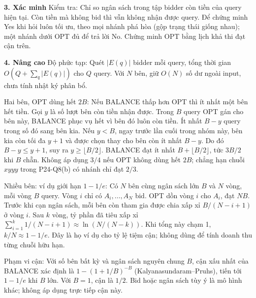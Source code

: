 \documentclass[10pt,a4paper,twocolumn]{article}
\newcommand{\key}[1]{#1:\enspace}
\newcommand{\unitheading}[2]{%
  \par\addvspace{1pt}\noindent\textbf{#1. #2}\enspace}
\newcommand{\unitverification}{\unitheading{3}{Xác minh}}
\newcommand{\unitadvanced}{\unitheading{4}{Nâng cao}}
\begin{document}

\unitverification
\key{Kiểm tra} Chỉ so ngân sách trong tập bidder còn tiền của query hiện tại. Còn tiền mà không bid thì vẫn không nhận được query. Để chứng minh Yes khi hỏi luôn tối ưu, theo mọi nhánh phá hòa (gộp trạng thái giống nhau); một nhánh dưới OPT đủ để trả lời No. Chứng minh OPT bằng lịch khả thi đạt cận trên.

\unitadvanced
\key{Độ phức tạp} Quét $|E(q)|$ bidder mỗi query, tổng thời gian $O(Q+\sum_q|E(q)|)$ cho $Q$ query. Với $N$ bên, giữ $O(N)$ số dư ngoài input, chưa tính nhật ký phân bổ.

\key{Hai bên, OPT dùng hết $2B$} Nếu BALANCE thấp hơn OPT thì ít nhất một bên hết tiền. Gọi $y$ là số lượt bên còn tiền nhận được. Trong $B$ query OPT gán cho bên này, BALANCE phục vụ hết vì bên đó luôn còn tiền. Ít nhất $B-y$ query trong số đó sang bên kia. Nếu $y<B$, ngay trước lần cuối trong nhóm này, bên kia còn tối đa $y+1$ và được chọn thay cho bên còn ít nhất $B-y$. Do đó $B-y\le y+1$, suy ra $y\ge\lfloor B/2\rfloor$. BALANCE đạt ít nhất $B+\lfloor B/2\rfloor$, tức $3B/2$ khi $B$ chẵn. Không áp dụng $3/4$ nếu OPT không dùng hết $2B$; chẳng hạn chuỗi $xyyy$ trong P24-Q8(b) có nhánh chỉ đạt $2/3$.

\key{Nhiều bên: ví dụ giới hạn $1-1/e$} Có $N$ bên cùng ngân sách lớn $B$ và $N$ vòng, mỗi vòng $B$ query. Vòng $i$ chỉ có $A_i,\ldots,A_N$ bid. OPT dồn vòng $i$ cho $A_i$, đạt $NB$. Trước khi cạn ngân sách, mỗi bên còn tham gia được chia xấp xỉ $B/(N-i+1)$ ở vòng $i$. Sau $k$ vòng, tỷ phần đã tiêu xấp xỉ $\sum_{i=1}^k 1/(N-i+1)\approx\ln(N/(N-k))$. Khi tổng này chạm 1, $k/N\approx1-1/e$. Đây là họ ví dụ cho tỷ lệ tiệm cận; không dùng để tính doanh thu từng chuỗi hữu hạn.

\key{Phạm vi cận} Với số bên bất kỳ và ngân sách nguyên chung $B$, cận xấu nhất của BALANCE xác định là $1-(1+1/B)^{-B}$ (Kalyanasundaram--Pruhs), tiến tới $1-1/e$ khi $B$ lớn. Với $B=1$, cận là $1/2$. Bid hoặc ngân sách tùy ý là mô hình khác; không áp dụng trực tiếp cận này.
\end{document}
